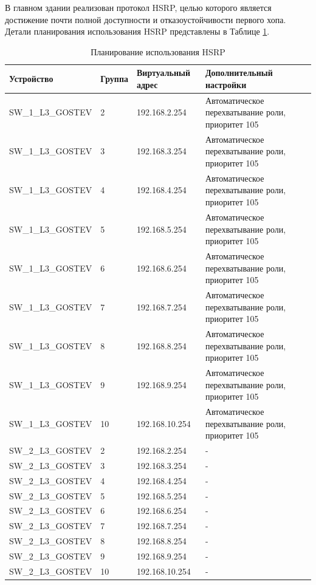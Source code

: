 \documentclass[14pt, a4paper]{extarticle}
\numberwithin{equation}{section}
\begin{document}
В главном здании реализован протокол HSRP, целью которого является достижение почти полной 
доступности и отказоустойчивости первого хопа. Детали планирования использования HSRP представлены в Таблице \ref{table:hsrp_plan_mainDep}.


\newpage
\begin{table}[H]
\centering
\small
\caption{Планирование использования HSRP}
\label{table:hsrp_plan_mainDep}
\begin{tabular}{|m{4cm}|m{2cm}|m{4cm}|m{4cm}|}
\hline
\textbf{Устройство} & \textbf{Группа} & \textbf{Виртуальный адрес} & \textbf{Дополнительный настройки}\\ \hline
SW\_1\_L3\_GOSTEV & 2 & 192.168.2.254 & Автоматическое перехватывание роли, приоритет 105 \\ \hline
SW\_1\_L3\_GOSTEV & 3 & 192.168.3.254 & Автоматическое перехватывание роли, приоритет 105 \\ \hline
SW\_1\_L3\_GOSTEV & 4 & 192.168.4.254 & Автоматическое перехватывание роли, приоритет 105 \\ \hline
SW\_1\_L3\_GOSTEV & 5 & 192.168.5.254 & Автоматическое перехватывание роли, приоритет 105 \\ \hline
SW\_1\_L3\_GOSTEV & 6 & 192.168.6.254 & Автоматическое перехватывание роли, приоритет 105 \\ \hline
SW\_1\_L3\_GOSTEV & 7 & 192.168.7.254 & Автоматическое перехватывание роли, приоритет 105 \\ \hline
SW\_1\_L3\_GOSTEV & 8 & 192.168.8.254 & Автоматическое перехватывание роли, приоритет 105 \\ \hline
SW\_1\_L3\_GOSTEV & 9 & 192.168.9.254 & Автоматическое перехватывание роли, приоритет 105 \\ \hline
SW\_1\_L3\_GOSTEV & 10 & 192.168.10.254 & Автоматическое перехватывание роли, приоритет 105 \\ \hline

SW\_2\_L3\_GOSTEV & 2 & 192.168.2.254 & - \\ \hline
SW\_2\_L3\_GOSTEV & 3 & 192.168.3.254 & - \\ \hline
SW\_2\_L3\_GOSTEV & 4 & 192.168.4.254 & - \\ \hline
SW\_2\_L3\_GOSTEV & 5 & 192.168.5.254 & - \\ \hline
SW\_2\_L3\_GOSTEV & 6 & 192.168.6.254 & - \\ \hline
SW\_2\_L3\_GOSTEV & 7 & 192.168.7.254 & - \\ \hline
SW\_2\_L3\_GOSTEV & 8 & 192.168.8.254 & - \\ \hline
SW\_2\_L3\_GOSTEV & 9 & 192.168.9.254 & - \\ \hline
SW\_2\_L3\_GOSTEV & 10 & 192.168.10.254 & - \\ \hline

\hline
\end{tabular}
\end{table}
\end{document}

